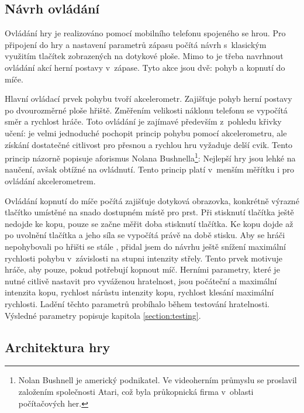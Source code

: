 \documentclass[thesis=B,czech,hidelinks]{FITthesis}[2012/06/26] %
\begin{document}
\subsection{Návrh ovládání}

Ovládání hry je realizováno pomocí mobilního telefonu spojeného se hrou. Pro připojení do hry a nastavení parametrů zápasu počítá návrh s~klasickým využitím tlačítek zobrazených na dotykové ploše. Mimo to je třeba navrhnout ovládání akcí herní postavy v~zápase. Tyto akce jsou dvě: pohyb a kopnutí do míče.

Hlavní ovládací prvek pohybu tvoří akcelerometr. Zajišťuje pohyb herní postavy po dvourozměrné ploše hřiště. Změřením velikosti náklonu telefonu se vypočítá směr a rychlost hráče. Toto ovládání je zajímavé především z~pohledu křivky učení: je velmi jednoduché pochopit princip pohybu pomocí akcelerometru, ale získání dostatečné citlivost pro přesnou a rychlou hru vyžaduje delší cvik. Tento princip názorně popisuje aforismus Nolana Bushnella\footnote{Nolan Bushnell je americký podnikatel. Ve videoherním průmyslu se proslavil založením společnosti Atari, což byla průkopnická firma v~oblasti počítačových her.\cite{atari}}: Nejlepší hry jsou lehké na naučení, avšak obtížné na ovládnutí. \cite{atari} Tento princip platí v~menším měřítku i pro ovládání akcelerometrem.

Ovládání kopnutí do míče počítá zajišťuje dotyková obrazovka, konkrétně výrazné tlačítko umístěné na snado dostupném místě pro prst. Při stisknutí tlačítka ještě nedojde ke kopu, pouze se začne měřit doba stisknutí tlačítka. Ke kopu dojde až po uvolnění tlačítka a jeho síla se vypočítá právě na době stisku. Aby se hráči nepohybovali po hřišti se stále , přidal jsem do návrhu ještě snížení maximální rychlosti pohybu v~závislosti na stupni intenzity střely. Tento prvek motivuje hráče, aby  pouze, pokud potřebují kopnout míč. Herními parametry, které je nutné citlivě nastavit pro vyváženou hratelnost, jsou počáteční a maximální intenzita kopu, rychlost nárůstu intenzity kopu, rychlost klesání maximální rychlosti. Ladění těchto parametrů probíhalo během testování hratelnosti. Výsledné parametry popisuje kapitola \ref{section:testing}.


\subsection{Architektura hry}
\end{document}
